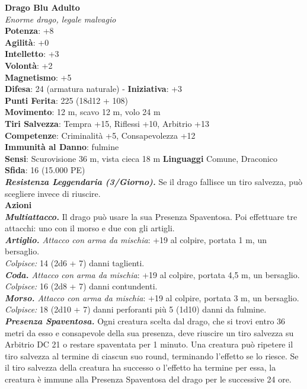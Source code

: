 \begin{multicols}{2}
\medskip\textbf{Drago Blu Adulto}\\
\emph{Enorme drago, legale malvagio}\\
\textbf{Potenza}: +8\\
\textbf{Agilità}: +0\\
\textbf{Intelletto}: +3\\
\textbf{Volontà}: +2\\
\textbf{Magnetismo}: +5\\
\textbf{Difesa}: 24 (armatura naturale) - \textbf{Iniziativa}: +3\\
\textbf{Punti Ferita}: 225 (18d12 + 108)\\
\textbf{Movimento}: 12 m, scavo 12 m, volo 24 m\\
\textbf{Tiri Salvezza}: Tempra +15, Riflessi +10, Arbitrio +13\\
\textbf{Competenze}: Criminalità +5, Consapevolezza +12\\
\textbf{Immunità al Danno}: fulmine\\
\textbf{Sensi}: Scurovisione 36 m, vista cieca 18 m
\textbf{Linguaggi} Comune, Draconico\\
\textbf{Sfida}: 16 (15.000 PE)\smallskip\\
\emph{\textbf{Resistenza Leggendaria (3/Giorno).}} Se il drago fallisce un tiro salvezza, può scegliere invece di riuscire.\\
\smallskip\textbf{Azioni}\\
\emph{\textbf{Multiattacco.}} Il drago può usare la sua Presenza Spaventosa. Poi effettuare tre attacchi: uno con il morso e due con gli artigli.\\
\emph{\textbf{Artiglio.} Attacco con arma da mischia}: +19 al colpire, portata 1 m, un bersaglio.\\
\emph{Colpisce:} 14 (2d6 + 7) danni taglienti.\\
\emph{\textbf{Coda.} Attacco con arma da mischia}: +19 al colpire, portata 4,5 m, un bersaglio.\\
\emph{Colpisce:} 16 (2d8 + 7) danni contundenti.\\
\emph{\textbf{Morso.} Attacco con arma da mischia}: +19 al colpire, portata 3 m, un bersaglio.\\
\emph{Colpisce:} 18 (2d10 + 7) danni perforanti più 5 (1d10) danni da fulmine.\\
\emph{\textbf{Presenza Spaventosa.}} Ogni creatura scelta dal drago, che si trovi entro 36 metri da esso e consapevole della sua presenza, deve riuscire un tiro salvezza su Arbitrio DC  21 o restare spaventata per 1 minuto. Una creatura può ripetere il tiro salvezza al termine di ciascun suo round, terminando l'effetto se lo riesce. Se il tiro salvezza della creatura ha successo o l'effetto ha termine per essa, la creatura è immune alla Presenza Spaventosa del drago per le successive 24 ore.\\

\end{multicols}
